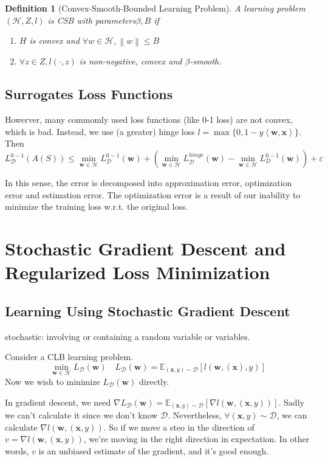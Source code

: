 \documentclass{book}
\newcommand{\nm}[1]{\left\|#1\right\|}
\newcommand{\dual}[1]{\left<#1\right>}
\renewcommand{\H}{\mathcal{H}}
\newcommand{\D}{\mathcal{D}}
\newtheorem{Def}{Definition}[section]
\begin{document}
\begin{Def}[Convex-Smooth-Bounded Learning Problem]
  A learning problem $(\H,Z,l)$ is CSB with parameters$ \beta,B$ if
  \begin{enumerate}
  \item $H$ is convex and $\forall w\in \H,\nm{w}\leq B$
  \item $\forall z\in Z, l(\cdot,z)$ is non-negative, convex and $\beta$-smooth.
  \end{enumerate}
\end{Def}

\section{Surrogates Loss Functions}
Howerver, many commomly used loss functions (like 0-1 loss) are not convex, which is bad. Instead, we use (a greater) hinge loss $l=\max\{0,1-y\dual{\mathbf{w},\mathbf{x}}\}$. Then
\[L_{\D}^{0-1}(A(S))\leq \min_{\mathbf{w}\in \H}L_{\D}^{0-1}(\mathbf{w})+(\min_{\mathbf{w}\in \H}L_{\D}^{hinge}(\mathbf{w})-\min_{\mathbf{w}\in \H}L_{D}^{0-1}(\mathbf{w}))+\varepsilon\]

In this sense, the error is decomposed into approximation error, optimization error and estimation error. The optimization error is a result of our inability to minimize the training loss w.r.t. the original loss.

\chapter{Stochastic Gradient Descent and Regularized Loss Minimization}

\section{Learning Using Stochastic Gradient Descent}
stochastic: involving or containing a random variable or variables.

Consider a CLB learning problem. 
\begin{equation}
\min_{\mathbf{w}\in\H}L_{\D}\left( \mathbf{w}\right) \quad L_{\D}\left( \mathbf{w}\right)= \mathbb{E}_{\left(\mathbf{x},y\right)\sim \D}\left[ l(\mathbf{w},(\mathbf{x}),y)\right]
\end{equation}
 Now we wish to minimize $L_{\D}\left( \mathbf{w}\right)$ directly.

 In gradient descent, we need $\nabla L_{\D}\left( \mathbf{w}\right)=\mathbb{E}_{(\mathbf{x},y)\sim\D}\left[\nabla l(\mathbf{w},(\mathbf{x},y))\right]$. Sadly we can't calculate it since we don't know $\D$. Nevertheless, $\forall \left(\mathbf{x},y\right)\sim\D$, we can calculate $\nabla l \left(\mathbf{w},\left(\mathbf{x},y\right)\right)$. So if we move a steo in the direction of $v=\nabla l \left(\mathbf{w},\left(\mathbf{x},y\right)\right)$, we're moving in the right direction in expectation. In other words, $v$ is an unbiased estimate of the gradient, and it's good enough.
\end{document}
